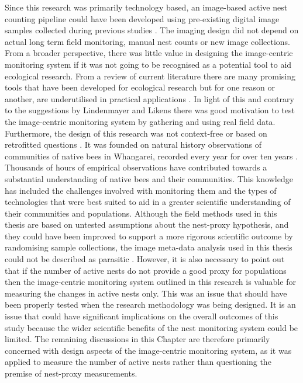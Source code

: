 Since this research was primarily technology based, an image-based active nest counting pipeline could have been developed using pre-existing digital image samples collected during previous studies \cite{Hart2004,Hart2007}. The imaging design did not depend on actual long term field monitoring, manual nest counts or new image collections. From a broader perspective, there was little value in designing the image-centric monitoring system if it was not going to be recognised as a potential tool to aid ecological research. From a review of current literature there are many promising tools that have been developed for ecological research but for one reason or another, are underutilised in practical applications \cite{Potamitis2006,Raman2007,Batista2011}. In light of this and  contrary to the suggestions by Lindenmayer and Likens \cite{Lindenmayer2013} there was good motivation to test the image-centric monitoring system by gathering and using real field data. Furthermore, the design of this research was not context-free or based on retrofitted questions \cite{Lindenmayer2013}. It was founded on natural history observations of communities of native bees in Whangarei, recorded every year for over ten years \cite{Hart2004,Hart2007}. Thousands of hours of empirical observations have contributed towards a substantial understanding of native bees and their communities. This knowledge has included the challenges involved with monitoring them and the types of technologies that were best suited to aid in a greater scientific understanding of their communities and populations. Although the field methods used in this thesis are based on untested assumptions about the nest-proxy hypothesis, and they could have been improved to support a more rigorous scientific outcome by randomising sample collections, the image meta-data analysis used in this thesis could not be described as parasitic \cite{Lindenmayer2013}. However, it is also necessary to point out that if the number of active nests do not provide a good proxy for populations then the image-centric monitoring system outlined in this research is valuable for measuring the changes in active nests only. This was an issue that should have been properly tested when the research methodology was being designed. It is an issue that could have significant implications on the overall outcomes of this study because the wider scientific benefits of the nest monitoring system could be limited. The remaining discussions in this Chapter are therefore primarily concerned with design aspects of the image-centric monitoring system, as it was applied to measure the number of active nests rather than questioning the premise of nest-proxy measurements.

